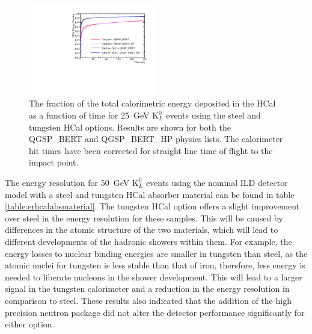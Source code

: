 \begin{figure}[h!]
\centering
\includegraphics[width=0.5\textwidth]{OptimisationStudies/Plots/Description/HCalAbsorberMaterialTimings.pdf}
\caption[The fraction of the total calorimetric energy deposited in the HCal as a function of time for 25~GeV $\text{K}^{0}_{L}$ events using the steel and tungsten HCal options.  Results are shown for both the QGSP\_BERT and QGSP\_BERT\_HP physics lists.  The calorimeter hit times have been corrected for straight line time of flight to the impact point.]{The fraction of the total calorimetric energy deposited in the HCal as a function of time for 25~GeV $\text{K}^{0}_{L}$ events using the steel and tungsten HCal options.  Results are shown for both the QGSP\_BERT and QGSP\_BERT\_HP physics lists.  The calorimeter hit times have been corrected for straight line time of flight to the impact point.}
\label{fig:hcalabsmaterialtiming}
\end{figure} 

The energy resolution for 50~GeV $\text{K}^{0}_{L}$ events using the nominal ILD detector model with a steel and tungsten HCal absorber material can be found in table \ref{table:erhcalabsmaterial}.  The tungsten HCal option offers a slight improvement over steel in the energy resolution for these samples.  This will be caused by differences in the atomic structure of the two materials, which will lead to different developments of the hadronic showers within them. For example, the energy losses to nuclear binding energies are smaller in tungsten than steel, as the atomic nuclei for tungsten is less stable than that of iron, therefore, less energy is needed to liberate nucleons in the shower development.  This will lead to a larger signal in the tungsten calorimeter and a reduction in the energy resolution in comparison to steel.  These results also indicated that the addition of the high precision neutron package did not alter the detector performance significantly for either option.  

